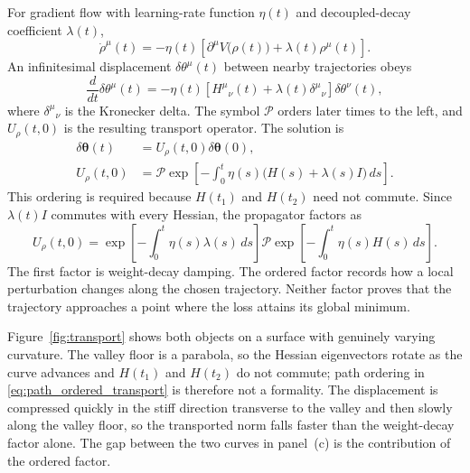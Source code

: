 \documentclass[11pt,letterpaper]{article}
\newcommand{\thet}{\bm{\theta}}
\begin{document}
For gradient flow with learning-rate function $\eta(t)$ and decoupled-decay
coefficient $\lambda(t)$,
\begin{equation}
  \dot\rho^\mu(t)
  =-\eta(t)\left[
    \partial^\mu V\bigl(\rho(t)\bigr)
    +\lambda(t)\rho^\mu(t)
  \right].
\end{equation}
An infinitesimal displacement $\delta\theta^\mu(t)$ between nearby
trajectories obeys
\begin{equation}\label{eq:tangent_flow}
  \frac{d}{dt}\delta\theta^\mu(t)
  =-\eta(t)\left[
    H^\mu{}_{\nu}(t)+\lambda(t)\delta^\mu{}_{\nu}
  \right]\delta\theta^\nu(t),
\end{equation}
where $\delta^\mu{}_{\nu}$ is the Kronecker delta. The symbol $\mathcal P$
orders later times to the left, and $U_\rho(t,0)$ is the resulting transport
operator. The solution is
\begin{equation}\label{eq:path_ordered_transport}
  \begin{aligned}
    \delta\thet(t)&=U_\rho(t,0)\delta\thet(0),\\
    U_\rho(t,0)
      &=\mathcal P\exp\!\left[
        -\int_0^t\eta(s)\bigl(H(s)+\lambda(s)I\bigr)\,ds
      \right].
  \end{aligned}
\end{equation}
This ordering is required because
$H(t_1)$ and $H(t_2)$ need not commute.
Since $\lambda(t)I$ commutes with every Hessian, the propagator factors as
\begin{equation}
  U_\rho(t,0)
  =\exp\!\left[-\int_0^t\eta(s)\lambda(s)\,ds\right]
  \mathcal P\exp\!\left[-\int_0^t\eta(s)H(s)\,ds\right].
\end{equation}
The first factor is weight-decay damping. The ordered factor records how a
local perturbation changes along the chosen trajectory. Neither factor proves
that the trajectory approaches a point where the loss attains its global
minimum.

Figure~\ref{fig:transport} shows both objects on a surface with genuinely
varying curvature. The valley floor is a parabola, so the Hessian
eigenvectors rotate as the curve advances and $H(t_1)$ and $H(t_2)$ do not
commute; path ordering in \eqref{eq:path_ordered_transport} is therefore not
a formality. The displacement is compressed quickly in the stiff direction
transverse to the valley and then slowly along the valley floor, so the
transported norm falls faster than the weight-decay factor alone. The gap
between the two curves in panel~(c) is the contribution of the ordered
factor.
\end{document}
